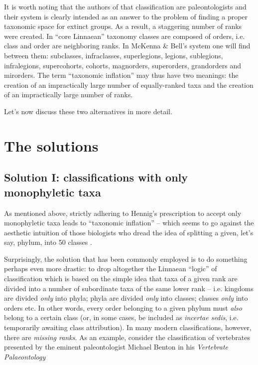 \begin{artengenv}
It is worth noting that the authors of that classification are paleontologists and their system is clearly intended as
an answer to the problem of finding a proper taxonomic space for extinct groups. As a result, a staggering number of
ranks were created. In ``core Linnaean'' taxonomy classes are composed of orders, i.e. class and order are neighboring
ranks. In McKenna \& Bell’s system one will find between them: subclasses, infraclasses, superlegions, legions,
sublegions, infralegions, supercohorts, cohorts, magnorders, superorders, grandorders and mirorders. The term
``taxonomic inflation'' may thus have two meanings: the creation of an impractically large number of equally-ranked taxa
and the creation of an impractically large number of ranks.

Let’s now discuss these two alternatives in more detail.

\section{The solutions}
\vspace*{-1cm}
\subsection{Solution I: classifications with only monophyletic taxa}

As mentioned above, strictly adhering to Hennig’s prescription to accept only monophyletic taxa leads to ``taxonomic
inflation'' -- which seems to go against the aesthetic intuition of those biologists who dread the idea of splitting a
given, let’s say, phylum, into 50 classes
\parencite{cavalier-smith_revised_1998}.

Surprisingly, the solution that has been commonly employed is to do something perhaps even more drastic: to drop
altogether the Linnaean ``logic'' of classification which is based on the simple idea that taxa of a given rank are
divided into a number of subordinate taxa of the same lower rank -- i.e. kingdoms are divided \textit{only} into phyla;
phyla are divided \textit{only} into classes; classes \textit{only} into orders etc. In other words, every order
belonging to a given phylum must \textit{also }belong to a certain class (or, in some cases, be included as
\textit{incertae sedis}, i.e. temporarily awaiting class attribution). In many modern classifications, however, there
are \textit{missing ranks}. As an example, consider the classification of vertebrates presented by the eminent
paleontologist Michael Benton in his \textit{Vertebrate Palaeontology}
\parencite[p.433nn]{benton_vertebrate_2014}


\end{artengenv}
